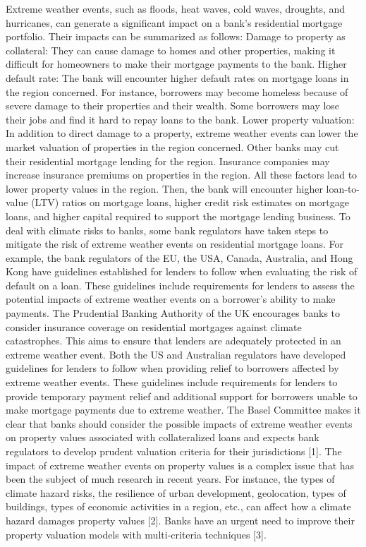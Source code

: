 Extreme weather events, such as floods, heat waves, cold waves, droughts, and hurricanes, can generate a significant impact on a bank’s residential mortgage portfolio. Their impacts can be summarized as follows:
Damage to property as collateral: They can cause damage to homes and other properties, making it difficult for homeowners to make their mortgage payments to the bank.
Higher default rate: The bank will encounter higher default rates on mortgage loans in the region concerned. For instance, borrowers may become homeless because of severe damage to their properties and their wealth. Some borrowers may lose their jobs and find it hard to repay loans to the bank.
Lower property valuation: In addition to direct damage to a property, extreme weather events can lower the market valuation of properties in the region concerned. Other banks may cut their residential mortgage lending for the region. Insurance companies may increase insurance premiums on properties in the region. All these factors lead to lower property values in the region. Then, the bank will encounter higher loan-to-value (LTV) ratios on mortgage loans, higher credit risk estimates on mortgage loans, and higher capital required to support the mortgage lending business.
To deal with climate risks to banks, some bank regulators have taken steps to mitigate the risk of extreme weather events on residential mortgage loans. For example, the bank regulators of the EU, the USA, Canada, Australia, and Hong Kong have guidelines established for lenders to follow when evaluating the risk of default on a loan. These guidelines include requirements for lenders to assess the potential impacts of extreme weather events on a borrower’s ability to make payments. The Prudential Banking Authority of the UK encourages banks to consider insurance coverage on residential mortgages against climate catastrophes. This aims to ensure that lenders are adequately protected in an extreme weather event. Both the US and Australian regulators have developed guidelines for lenders to follow when providing relief to borrowers affected by extreme weather events. These guidelines include requirements for lenders to provide temporary payment relief and additional support for borrowers unable to make mortgage payments due to extreme weather. The Basel Committee makes it clear that banks should consider the possible impacts of extreme weather events on property values associated with collateralized loans and expects bank regulators to develop prudent valuation criteria for their jurisdictions [1].
The impact of extreme weather events on property values is a complex issue that has been the subject of much research in recent years. For instance, the types of climate hazard risks, the resilience of urban development, geolocation, types of buildings, types of economic activities in a region, etc., can affect how a climate hazard damages property values [2]. Banks have an urgent need to improve their property valuation models with multi-criteria techniques [3].
